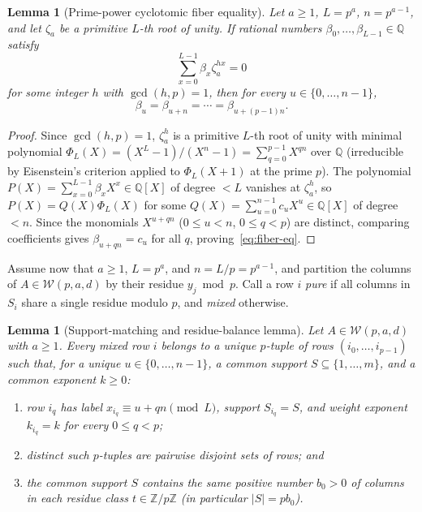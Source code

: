 \documentclass[11pt,reqno]{amsart}
\numberwithin{equation}{section}
\newtheorem{lemma}[theorem]{Lemma}
\theoremstyle{definition}
\theoremstyle{remark}
\newcommand{\Q}{\mathbb{Q}}
\newcommand{\Z}{\mathbb{Z}}
\begin{document}
\begin{lemma}[Prime-power cyclotomic fiber equality]
\label{lem:cyclo-fiber}
Let $a\ge 1$, $L=p^a$, $n=p^{a-1}$, and let $\zeta_a$ be a primitive $L$-th root of unity. If rational numbers $\beta_0,\ldots,\beta_{L-1}\in\Q$ satisfy
\[
\sum_{x=0}^{L-1} \beta_x \zeta_a^{hx} = 0
\]
for some integer $h$ with $\gcd(h,p)=1$, then for every $u\in\{0,\ldots,n-1\}$,
\begin{equation}
\label{eq:fiber-eq}
\beta_u = \beta_{u+n} = \cdots = \beta_{u+(p-1)n}.
\end{equation}
\end{lemma}

\begin{proof}
Since $\gcd(h,p)=1$, $\zeta_a^h$ is a primitive $L$-th root of unity with minimal polynomial $\Phi_L(X)=(X^L-1)/(X^n-1)=\sum_{q=0}^{p-1} X^{qn}$ over $\Q$ (irreducible by Eisenstein's criterion applied to $\Phi_L(X+1)$ at the prime $p$). The polynomial $P(X)=\sum_{x=0}^{L-1}\beta_x X^x\in\Q[X]$ of degree $<L$ vanishes at $\zeta_a^h$, so $P(X)=Q(X)\Phi_L(X)$ for some $Q(X)=\sum_{u=0}^{n-1} c_u X^u\in\Q[X]$ of degree $<n$. Since the monomials $X^{u+qn}$ ($0\le u<n$, $0\le q<p$) are distinct, comparing coefficients gives $\beta_{u+qn}=c_u$ for all $q$, proving~\eqref{eq:fiber-eq}.
\end{proof}

Assume now that $a\ge 1$, $L=p^a$, and $n=L/p=p^{a-1}$, and partition the columns of $A\in\mathcal{W}(p,a,d)$ by their residue $y_j\bmod p$. Call a row $i$ \emph{pure} if all columns in $S_i$ share a single residue modulo $p$, and \emph{mixed} otherwise.

\begin{lemma}[Support-matching and residue-balance lemma]
\label{lem:matching}
Let $A\in\mathcal{W}(p,a,d)$ with $a\ge 1$. Every mixed row $i$ belongs to a unique $p$-tuple of rows $(i_0,\ldots,i_{p-1})$ such that, for a unique $u\in\{0,\ldots,n-1\}$, a common support $S\subseteq\{1,\ldots,m\}$, and a common exponent $k\ge 0$:
\begin{enumerate}[label=(\roman*),leftmargin=2em]
\item row $i_q$ has label $x_{i_q}\equiv u+qn\pmod L$, support $S_{i_q}=S$, and weight exponent $k_{i_q}=k$ for every $0\le q<p$;
\item distinct such $p$-tuples are pairwise disjoint sets of rows; and
\item the common support $S$ contains the same positive number $b_0>0$ of columns in each residue class $t\in\Z/p\Z$ (in particular $|S|=pb_0$).
\end{enumerate}
\end{lemma}
\end{document}
